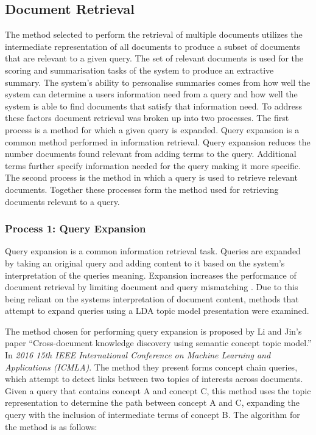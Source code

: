 \subsection{Document Retrieval}
\label{subsec:3.5.3}
The method selected to perform the retrieval of multiple documents utilizes the intermediate representation of all documents to produce a subset of documents that are relevant to a given query. The set of relevant documents is used for the scoring and summarisation tasks of the system to produce an extractive summary. The system’s ability to personalise summaries comes from how well the system can determine a users information need from a query and how well the system is able to find documents that satisfy that information need. To address these factors document retrieval was broken up into two processes. The first process is a method for which a given query is expanded. Query expansion is a common method performed in information retrieval. Query expansion reduces the number documents found relevant from adding terms to the query. Additional terms further specify information needed for the query making it more specific. The second process is the method in which a query is used to retrieve relevant documents. Together these processes form the method used for retrieving documents relevant to a query.

\subsubsection{Process 1: Query Expansion}
Query expansion is a common information retrieval task. Queries are expanded by taking an original query and adding content to it based on the system's interpretation of the queries meaning. Expansion increases the performance of document retrieval by limiting document and query mismatching \citep{carpineto2012survey}. Due to this being reliant on the systems interpretation of document content, methods that attempt to expand queries using a LDA topic model presentation were examined. 

The method chosen for performing query expansion is proposed by Li and Jin’s \citeyear{li2016cross} paper “Cross-document knowledge discovery using semantic concept topic model.” In \emph{2016 15th IEEE International Conference on Machine Learning and Applications (ICMLA)}. The method they present forms concept chain queries, which attempt to detect links between two topics of interests across documents. Given a query that contains concept A and concept C, this method uses the topic representation to determine the path between concept A and C, expanding the query with the inclusion of intermediate terms of concept B. The algorithm for the method is as follows:


